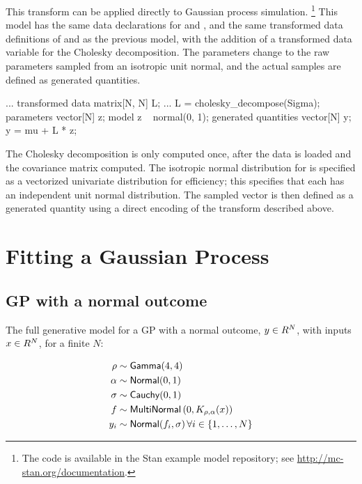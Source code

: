 This transform can be applied directly to Gaussian process
simulation.%
%
\footnote{The code is available in the Stan example model repository;
see \url{http://mc-stan.org/documentation}.}
%
This model has the same data declarations for  and ,
and the same transformed data definitions of  and
 as the previous model, with the addition of a transformed
data variable for the Cholesky decomposition.  The parameters change
to the raw parameters sampled from an isotropic unit normal, and the
actual samples are defined as generated quantities.
%
\begin{stancode}
...
transformed data {
  matrix[N, N] L;
...
  L = cholesky_decompose(Sigma);
}
parameters {
  vector[N] z;
}
model {
  z ~ normal(0, 1);
}
generated quantities {
  vector[N] y;
  y = mu + L * z;
}
\end{stancode}
%
The Cholesky decomposition is only computed once, after the data is
loaded and the covariance matrix  computed.  The isotropic
normal distribution for  is specified as a vectorized
univariate distribution for efficiency; this specifies that each
 has an independent unit normal distribution.  The sampled
vector  is then defined as a generated quantity using a direct
encoding of the transform described above.

\section{Fitting a Gaussian Process}\label{fit-gp.section}

\subsection{GP with a normal outcome}

The full generative model for a GP with a normal outcome, 
$y \in \R^N$, with inputs $x \in \R^N$, for a finite $N$:

\begin{align*}
  \rho & \sim \distro{Gamma}(4,4) \\
  \alpha & \sim \distro{Normal}(0, 1) \\
  \sigma & \sim \distro{Cauchy}(0, 1) \\
  f & \sim \distro{MultiNormal}\left(0, K_{\rho,\alpha}(x)\right) \\
  y_i & \sim \distro{Normal}(f_i, \sigma) \, \forall i \in \{1, \dots, N\}
\end{align*}

